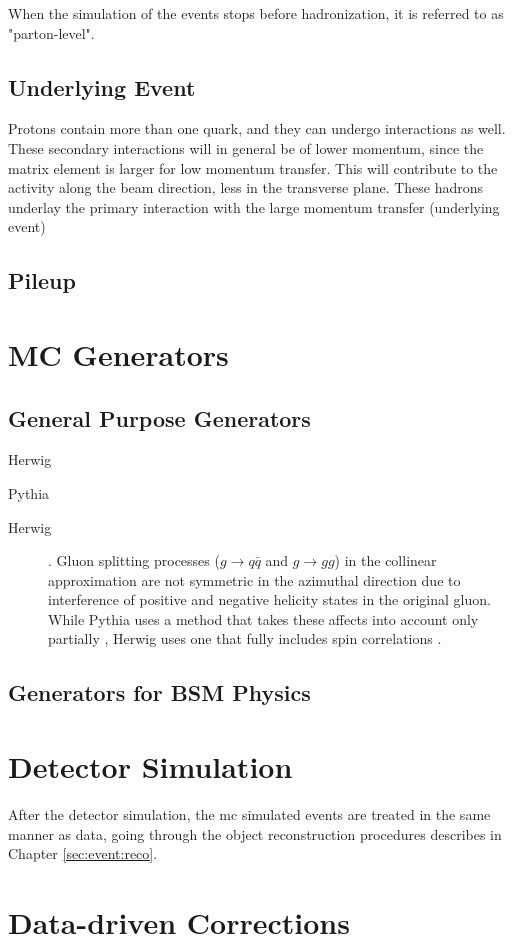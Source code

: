 When the simulation of the events stops before hadronization, it is referred to as "parton-level".

\subsection{Underlying Event}

Protons contain more than one quark, and they can undergo interactions as well. These secondary interactions will in general be of lower momentum, since the matrix element is larger for low momentum transfer. This will contribute to the activity along the beam direction, less in the transverse plane. These hadrons underlay the primary interaction with the large momentum transfer (underlying event)


\subsection{Pileup}

\section{MC Generators}

\subsection{General Purpose Generators}

\begin{description}
\item[Herwig] \cite{Corcella:2000bw,Bahr:2008pv,Bellm:2015jjp}
\item[Pythia] \cite{Sjostrand:2006za,Sjostrand:2014zea}
\item[Herwig] \cite{Gleisberg:2008ta}. Gluon splitting processes ($g \rightarrow q\bar{q}$ and $g \rightarrow gg$) in the collinear approximation are not symmetric in the azimuthal direction due to interference of positive and negative helicity states in the original gluon. While Pythia uses a method that takes these affects into account only partially \cite{Webber:1987uy}, Herwig uses one that fully includes spin correlations \cite{Collins:1987cp}. 
\end{description}

\subsection{Generators for BSM Physics}


\section{Detector Simulation}

After the detector simulation, the \gls{mc} simulated events are treated in the same manner as data, going through the object reconstruction procedures
describes in Chapter \ref{sec:event:reco}.

\section{Data-driven Corrections}
